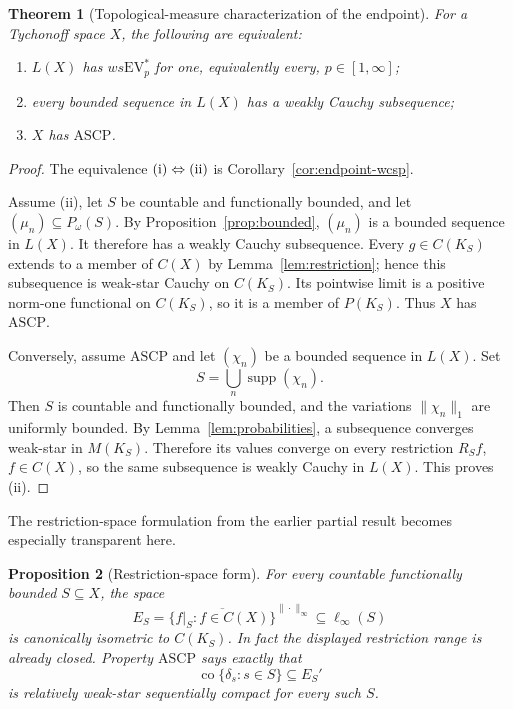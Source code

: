 \documentclass[11pt]{article}
\newtheorem{theorem}{Theorem}[section]
\newtheorem{proposition}[theorem]{Proposition}
\newcommand{\supp}{\operatorname{supp}}
\newcommand{\EV}{\mathrm{EV}}
\newcommand{\ASCP}{\mathrm{ASCP}}
\newcommand{\Pin}{P_{\!\omega}}
\begin{document}
\begin{theorem}[Topological-measure characterization of the endpoint]
\label{thm:ascp}
For a Tychonoff space $X$, the following are equivalent:
\begin{enumerate}[label=\textup{(\roman*)}]
\item $L(X)$ has $ws\EV^*_p$ for one, equivalently every, $p\in[1,\infty]$;
\item every bounded sequence in $L(X)$ has a weakly Cauchy subsequence;
\item $X$ has $\ASCP$.
\end{enumerate}
\end{theorem}

\begin{proof}
The equivalence \(\textup{(i)}\Leftrightarrow\textup{(ii)}\) is
Corollary~\ref{cor:endpoint-wcsp}.

Assume (ii), let $S$ be countable and functionally bounded, and let
$(\mu_n)\subseteq\Pin(S)$.  By Proposition~\ref{prop:bounded}, $(\mu_n)$ is a
bounded sequence in $L(X)$.  It therefore has a weakly Cauchy subsequence.
Every $g\in C(K_S)$ extends to a member of $C(X)$ by
Lemma~\ref{lem:restriction}; hence this subsequence is weak-star Cauchy on
$C(K_S)$.  Its pointwise limit is a positive norm-one functional on $C(K_S)$,
so it is a member of $P(K_S)$.  Thus $X$ has $\ASCP$.

Conversely, assume $\ASCP$ and let $(\chi_n)$ be a bounded sequence in $L(X)$.
Set
\[
  S=\bigcup_n\supp(\chi_n).
\]
Then $S$ is countable and functionally bounded, and the variations
$\|\chi_n\|_1$ are uniformly bounded.  By Lemma~\ref{lem:probabilities}, a
subsequence converges weak-star in $M(K_S)$.  Therefore its values converge on
every restriction $R_Sf$, $f\in C(X)$, so the same subsequence is weakly Cauchy
in $L(X)$.  This proves (ii).
\end{proof}

The restriction-space formulation from the earlier partial result becomes
especially transparent here.

\begin{proposition}[Restriction-space form]\label{prop:restriction-space}
For every countable functionally bounded $S\subseteq X$, the space
\[
  E_S=\overline{\{f|_S:f\in C(X)\}}^{\|\cdot\|_\infty}
  \subseteq\ell_\infty(S)
\]
is canonically isometric to $C(K_S)$.  In fact the displayed restriction range
is already closed.  Property $\ASCP$ says exactly that
\[
  \operatorname{co}\{\delta_s:s\in S\}\subseteq E_S'
\]
is relatively weak-star sequentially compact for every such $S$.
\end{proposition}
\end{document}
